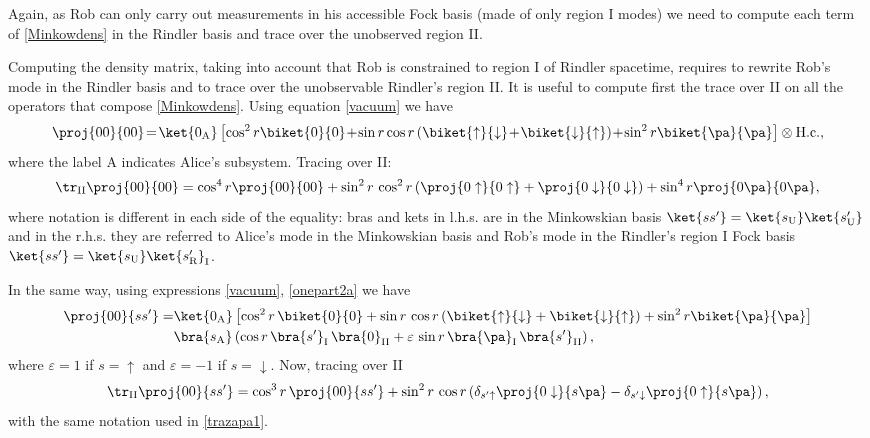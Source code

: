 Again, as Rob can only carry out measurements in his accessible Fock basis (made of only region I modes) we need to compute each term of \eqref{Minkowdens} in the Rindler basis and trace over the unobserved region II.

Computing the density matrix, taking into account that Rob is constrained to region I of Rindler spacetime, requires to rewrite Rob's mode in the Rindler basis and to trace over the unobservable Rindler's region II. It is useful to compute first the trace over II on all the operators that compose \eqref{Minkowdens}. Using equation \eqref{vacuum} we have
\begin{equation}
\proj{00}{00}\!=\!\ket{0_\text{A}}\left[\cos^2 r\biket{0}{0}\!+\!\sin r\cos r \left(\biket{\uparrow}{\downarrow}\!+\!\biket{\downarrow}{\uparrow}\right)\!+\!\sin^2 r\biket{\pa}{\pa}\right]\otimes \text{H.c.},
\end{equation}
where the label A indicates Alice's subsystem. Tracing over II:
\begin{equation}\label{trazapa1}
\tr_\text{II}\proj{00}{00}=\cos^4 r\proj{00}{00}+\sin^2r\,\cos^2r\left(\proj{0\uparrow}{0\uparrow}+\proj{0\downarrow}{0\downarrow}\right)+\sin^4r\proj{0\pa}{0\pa},
\end{equation}
where notation is different in each side of the equality: bras and kets in l.h.s. are in the Minkowskian basis $\ket{ss'}=\ket{s_\text{U}}\ket{s'_\text{U}}$ and in the r.h.s. they are referred to Alice's mode in the Minkowskian basis and Rob's mode in the Rindler's region I Fock basis $\ket{ss'}=\ket{s_\text{U}}\ket{s'_\text{R}}_\text{I}$.

In the same way, using expressions \eqref{vacuum}, \eqref{onepart2a} we have
\begin{align}
\nonumber\proj{00}{ss'}=&\ket{0_\text{A}}\left[\cos^2 r\,\biket{0}{0}+\sin r\,\cos r\left(\biket{\uparrow}{\downarrow}+\biket{\downarrow}{\uparrow}\right)+\sin^2 r\biket{\pa}{\pa}\right]\\*&\bra{s_\text{A}}\left(\cos r\,{\bra{s'}_\text{I}}\,{\bra{0}_\text{II}}+ \varepsilon\, \sin r\,{\bra{\pa}_\text{I}}\,{\bra{s'}_\text{II}}\right),
\end{align}
where $\varepsilon=1$ if $s=\uparrow$ and $\varepsilon=-1$ if $s=\downarrow$. Now, tracing over II
\begin{equation}\label{trazapa2}
\tr_\text{II}\proj{00}{ss'}=\cos^3 r\,\proj{00}{ss'}+\sin^2r\,\cos r\left(\delta_{s'\uparrow}\proj{0\downarrow}{s\pa}-\delta_{s'\downarrow}\proj{0\uparrow}{s\pa}\right),
\end{equation}
with the same notation used in \eqref{trazapa1}.

